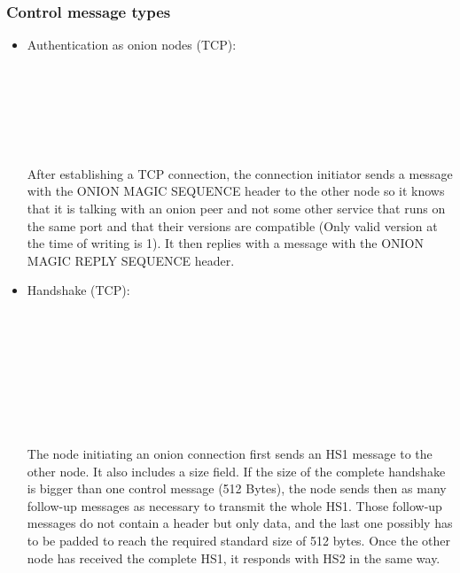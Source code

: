 \documentclass{article}
\begin{document}
\subsubsection{Control message types}
\label{subsec:control_message_types}
\begin{itemize}
\item Authentication as onion nodes (TCP):
	
	\begin{bytefield}[bitwidth=1.0em]{32}
	 \\
	 \\
	 \\
	 \\
	\skippedwords \\
	\end{bytefield}
	
	After establishing a TCP connection, the connection initiator sends a message with the ONION MAGIC SEQUENCE header to the other node so it knows that it is talking with an onion peer and not some other service that runs on the same port and that their versions are compatible (Only valid version at the time of writing is 1). It then replies with a message with the ONION MAGIC REPLY SEQUENCE header.
	
\item Handshake (TCP):

	\begin{bytefield}[bitwidth=1.0em]{32}
		 \\
		  \\
		 \\
		\skippedwords \\
		 \\
		 \\
		\skippedwords \\
	\end{bytefield}
	
The node initiating an onion connection first sends an HS1 message to the other node. It also includes a size field. If the size of the complete handshake is bigger than one control message (512 Bytes), the node sends then as many follow-up messages as necessary to transmit the whole HS1. Those follow-up messages do not contain a header but only data, and the last one possibly has to be padded to reach the required standard size of 512 bytes. Once the other node has received the complete HS1, it responds with HS2 in the same way.


\end{itemize}
\end{document}
